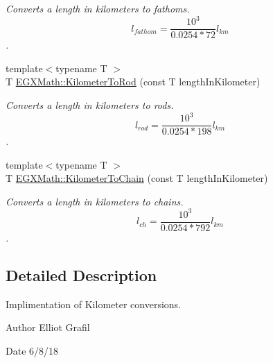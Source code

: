 \begin{DoxyCompactItemize}
\begin{DoxyCompactList}\small\item\em Converts a length in kilometers to fathoms. \[ l_{fathom}= \frac{10^{3}}{0.0254 * 72} l_{km} \]. \end{DoxyCompactList}\item 
{\footnotesize template$<$typename T $>$ }\\T \mbox{\hyperlink{group___e_g_x_math-_conversions-_length_conversions-_s_i-_kilometer-_surveyors_gae57f6033d241f64aa645a42bfe354567}{E\+G\+X\+Math\+::\+Kilometer\+To\+Rod}} (const T length\+In\+Kilometer)
\begin{DoxyCompactList}\small\item\em Converts a length in kilometers to rods. \[ l_{rod}= \frac{10^{3}}{0.0254 * 198} l_{km} \]. \end{DoxyCompactList}\item 
{\footnotesize template$<$typename T $>$ }\\T \mbox{\hyperlink{group___e_g_x_math-_conversions-_length_conversions-_s_i-_kilometer-_surveyors_ga42dd7fe86fb9ffdbc0a82b58876f9d6d}{E\+G\+X\+Math\+::\+Kilometer\+To\+Chain}} (const T length\+In\+Kilometer)
\begin{DoxyCompactList}\small\item\em Converts a length in kilometers to chains. \[ l_{ch}= \frac{10^{3}}{0.0254 * 792} l_{km} \]. \end{DoxyCompactList}\end{DoxyCompactItemize}


\subsection{Detailed Description}
Implimentation of Kilometer conversions. 

\begin{DoxyAuthor}{Author}
Elliot Grafil 
\end{DoxyAuthor}
\begin{DoxyDate}{Date}
6/8/18 
\end{DoxyDate}
